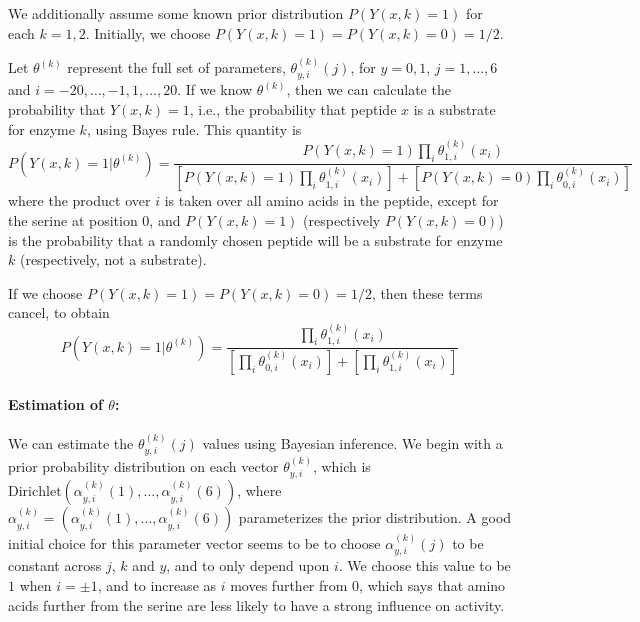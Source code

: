 \documentclass[12pt]{article}
\begin{document}
We additionally assume some known prior distribution $P(Y(x,k)=1)$ for each $k=1,2$.
Initially, we choose $P(Y(x,k)=1) = P(Y(x,k)=0) = 1/2$.

Let $\theta^{(k)}$ represent the full set of parameters, $\theta^{(k)}_{y,i}(j)$, for $y=0,1$, $j=1,\ldots,6$ and $i=-20,\ldots,-1,1,\ldots,20$.
If we know $\theta^{(k)}$, then we can calculate the probability that
$Y(x,k)=1$, i.e., the probability that peptide $x$ is a substrate for enzyme
$k$, using Bayes rule.  This quantity is
\begin{equation} \label{eq:prob_Y_orig}
  P\left(Y(x,k) = 1 | \theta^{(k)}\right) =
  \frac{P(Y(x,k)=1) \prod_{i} \theta^{(k)}_{1,i}(x_i)}{
  \left[ P(Y(x,k)=1) \prod_{i} \theta^{(k)}_{1,i}(x_i)\right] +
  \left[ P(Y(x,k)=0) \prod_{i} \theta^{(k)}_{0,i}(x_i)\right]}
\end{equation}
where the product over $i$ is taken over all amino acids in the peptide, except for the serine at position $0$,
and $P(Y(x,k)=1)$ (respectively $P(Y(x,k)=0)$) is the probability that a randomly chosen peptide will be a substrate for enzyme $k$ (respectively, not a substrate).

If we choose $P(Y(x,k)=1) = P(Y(x,k)=0) = 1/2$, then these terms cancel, to obtain
\begin{equation}
  \label{eq:prob_Y}
  P\left(Y(x,k) = 1 | \theta^{(k)}\right) =
  \frac{\prod_{i} \theta^{(k)}_{1,i}(x_i)}{
  \left[ \prod_{i} \theta^{(k)}_{0,i}(x_i)\right] +
  \left[ \prod_{i} \theta^{(k)}_{1,i}(x_i)\right]}
\end{equation}

\paragraph{Estimation of $\theta$:}
We can estimate the $\theta^{(k)}_{y,i}(j)$ values using Bayesian inference.
We begin with a prior probability distribution on each vector $\theta^{(k)}_{y,i}$, which is $\mathrm{Dirichlet}(\alpha^{(k)}_{y,i}(1),\ldots,\alpha^{(k)}_{y,i}(6))$,
where $\alpha^{(k)}_{y,i} = (\alpha^{(k)}_{y,i}(1),\ldots,\alpha^{(k)}_{y,i}(6))$ parameterizes the prior distribution.
A good initial choice for this parameter vector seems to be to choose
$\alpha^{(k)}_{y,i}(j)$ to be constant across $j$, $k$ and $y$, and to only depend upon $i$.
We choose this value to be $1$ when $i=\pm1$, and to increase as $i$ moves further from $0$, which says that amino acids further from the serine are less likely to have a strong influence on activity.
\end{document}

